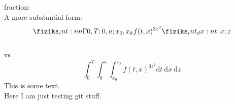 
fraction: \\
\noindent
A more substantial form: \[\Int[0,T;0,a;x_0, x_k]{f(t, x)^{3z^{2}}}[t;x;z]\]\\
vs \\
\[ \int^{T}_{0} \int^{a}_{0} \int^{x_k}_{x_0} f(t,x)^{3z^2} \text{d}t\ \text{d}x\ \text{d}z \]
This is some text.\\
Here I am just testing git stuff. \cite{bertoglioLec01}
\lipsum